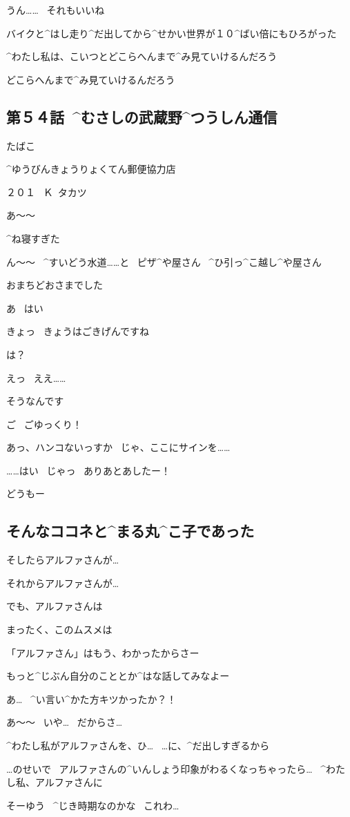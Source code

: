 \Sensei うん……
\ それもいいね

\page[148]
\Sensei バイクと^{はし}{走}り^{だ}{出}してから^{せかい}{世界}が１０^{ばい}{倍}にもひろがった

\page[149]
\Sensei ^{わたし}{私}は、こいつとどこらへんまで^{み}{見}ていけるんだろう

\page[152]
\Sensei どこらへんまで^{み}{見}ていけるんだろう


\subsection{第５４話\ ^{むさしの}{武蔵野}^{つうしん}{通信}}

\page[155]
\Sign たばこ

\Sign ^{ゆうびんきょうりょくてん}{郵便協力店}

\page[156]
\Sign ２０１
\ Ｋ\ タカツ

\page[158]
\Kokone あ〜〜

\Kokone ^{ね}{寝}すぎた

\Kokone ん〜〜
\ ^{すいどう}{水道}……と
\ ピザ^{や}{屋}さん
\ ^{ひ}{引}っ^{こ}{越}し^{や}{屋}さん

\page[164]
\Person おまちどおさまでした

\Kokone あ
\ はい

\Person きょっ
\ きょうはごきげんですね

\Kokone は？

\Kokone えっ
\ ええ……

\page[165]
\Kokone そうなんです

\Person ご
\ ごゆっくり！

\page[167]
\Person あっ、ハンコないっすか
\ じゃ、ここにサインを……

\Person ……はい
\ じゃっ
\ ありあとあしたー！

\Alpha どうもー


\subsection{そんなココネと^{まる}{丸}^{こ}{子}であった}

\Kokone そしたらアルファさんが…

\Kokone それからアルファさんが…

\Kokone でも、アルファさんは

\Maruko まったく、このムスメは

\Maruko 「アルファさん」はもう、わかったからさー

\Maruko もっと^{じぶん}{自分}のこととか^{はな}{話}してみなよー

\Maruko あ…
\ ^{い}{言}い^{かた}{方}キツかったか？！

\Maruko あ〜〜
\ いや…
\ だからさ…

\Kokone ^{わたし}{私}がアルファさんを、ひ…
\ …に、^{だ}{出}しすぎるから

\Kokone …のせいで
\ アルファさんの^{いんしょう}{印象}がわるくなっちゃったら…
\ ^{わたし}{私}、アルファさんに

\Maruko そーゆう
\ ^{じき}{時期}なのかな
\ これわ…
